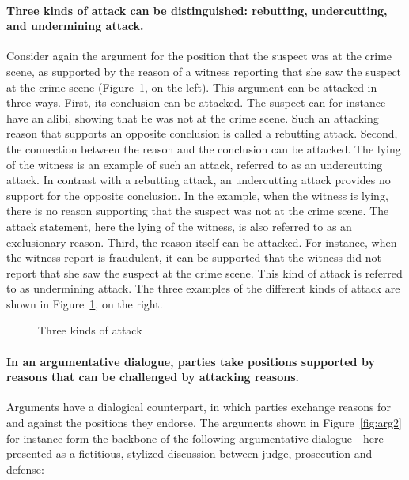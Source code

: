\documentclass[10pt]{article}
\begin{document}
\paragraph{Three kinds of attack can be distinguished: rebutting, undercutting, and undermining attack.}

Consider again the argument for the position that the suspect was at the crime scene, as supported by the reason of a witness reporting that she saw the suspect at the crime scene (Figure~\ref{fig:arg3}, on the left). This argument can be attacked in three ways. First, its conclusion can be attacked. The suspect can for instance have an alibi, showing that he was not at the crime scene. Such an attacking reason that supports an opposite conclusion is called a rebutting attack. Second, the connection between the reason and the conclusion can be attacked. The lying of the witness is an example of such an attack, referred to as an undercutting attack. In contrast with a rebutting attack, an undercutting attack provides no support for the opposite conclusion. In the example, when the witness is lying, there is no reason supporting that the suspect was not at the crime scene. The attack statement, here the lying of the witness, is also referred to as an exclusionary reason. Third, the reason itself can be attacked. For instance, when the witness report is fraudulent, it can be supported that the witness did not report that she saw the suspect at the crime scene. This kind of attack is referred to as undermining attack. The three examples of the different kinds of attack are shown in Figure~\ref{fig:arg3}, on the right.


\begin{figure}[bt]
\centering

\caption{Three kinds of attack\label{fig:arg3}}
\end{figure}

\paragraph{In an argumentative dialogue, parties take positions supported by reasons that can be challenged by attacking reasons.}

Arguments have a dialogical counterpart, in which parties exchange reasons for and against the positions they endorse. The arguments shown in Figure~\ref{fig:arg2} for instance form the backbone of the following argumentative dialogue---here presented as a fictitious, stylized discussion between judge, prosecution and defense:
\end{document}
